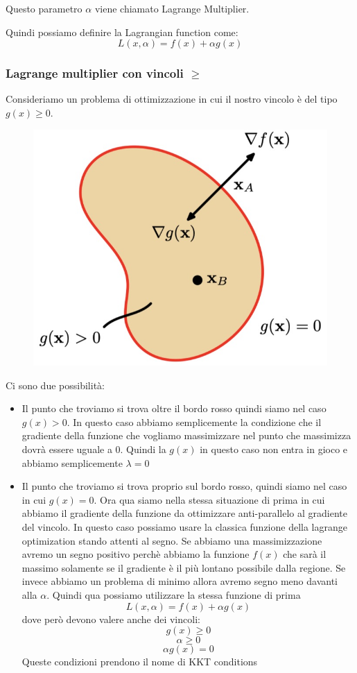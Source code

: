 \documentclass[14pt]{extreport}
\begin{document}
Questo parametro $\alpha$ viene chiamato Lagrange Multiplier.

Quindi possiamo definire la Lagrangian function come: $$L(x, \alpha) = f(x) + \alpha g(x)$$

\subsubsection{Lagrange multiplier con vincoli $\geq$}

Consideriamo un problema di ottimizzazione in cui il nostro vincolo è del tipo $g(x) \geq 0$.

\begin{figure}[H]
	\centering
	\includegraphics[width=0.5\linewidth]{349.jpeg}
\end{figure}

Ci sono due possibilità:

\begin{itemize}

	\item Il punto che troviamo si trova oltre il bordo rosso quindi siamo nel caso $g(x) > 0$. In questo caso abbiamo semplicemente la condizione che
	      il gradiente della funzione che vogliamo massimizzare nel punto che massimizza dovrà essere uguale a 0. Quindi la $g(x)$ in questo caso non
	      entra in gioco e abbiamo semplicemente $\lambda = 0$
	\item Il punto che troviamo si trova proprio sul bordo rosso, quindi siamo nel caso in cui $g(x) = 0$. Ora qua siamo nella stessa situazione di
	      prima in cui abbiamo il gradiente della funzione da ottimizzare anti-parallelo al gradiente del vincolo. In questo caso possiamo usare la
	      classica funzione della lagrange optimization stando attenti al segno. Se abbiamo una massimizzazione avremo un segno positivo perchè
	      abbiamo la funzione $f(x)$ che sarà il massimo solamente se il gradiente è il più lontano possibile dalla regione. Se invece abbiamo un
	      problema di minimo allora avremo segno meno davanti alla $\alpha$. Quindi qua possiamo utilizzare la stessa funzione di prima $$L(x, \alpha)
	      = f(x) + \alpha g(x)$$ dove però devono valere anche dei vincoli:
	      $$g(x) \geq 0$$ $$\alpha \geq 0$$ $$\alpha g(x) = 0$$ Queste condizioni prendono il nome di KKT conditions
\end{itemize}
\end{document}
